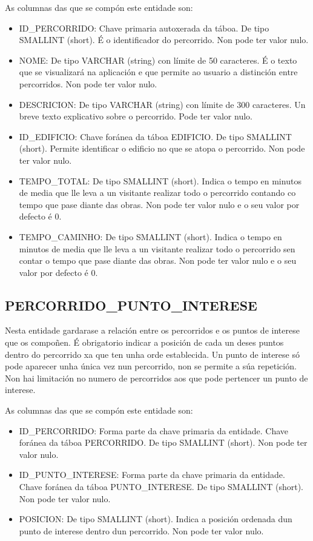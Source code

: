 As columnas das que se compón este entidade son:
\begin{itemize}
	\item ID\_PERCORRIDO: Chave primaria autoxerada da táboa. De tipo SMALLINT (short). É o identificador do percorrido. Non pode ter valor nulo.
	\item NOME: De tipo VARCHAR (string) con límite de 50 caracteres. É o texto que se visualizará na aplicación e que permite ao usuario a distinción entre percorridos. Non pode ter valor nulo.
	\item DESCRICION: De tipo VARCHAR (string) con límite de 300 caracteres. Un breve texto explicativo sobre o percorrido. Pode ter valor nulo.
	\item ID\_EDIFICIO: Chave foránea da táboa EDIFICIO. De tipo SMALLINT (short). Permite identificar o edificio no que se atopa o percorrido. Non pode ter valor nulo.
	\item TEMPO\_TOTAL: De tipo SMALLINT (short). Indica o tempo en minutos de media que lle leva a un visitante realizar todo o percorrido contando co tempo que pase diante das obras. Non pode ter valor nulo e o seu valor por defecto é 0.
	\item TEMPO\_CAMINHO: De tipo SMALLINT (short). Indica o tempo en minutos de media que lle leva a un visitante realizar todo o percorrido sen contar o tempo que pase diante das obras. Non pode ter valor nulo e o seu valor por defecto é 0.
\end{itemize}


\subsection{PERCORRIDO\_PUNTO\_INTERESE}
Nesta entidade gardarase a relación entre os percorridos e os puntos de interese que os compoñen. É obrigatorio indicar a posición de cada un deses puntos dentro do percorrido xa que ten unha orde establecida. Un punto de interese só pode aparecer unha única vez nun percorrido, non se permite a súa repetición. Non hai limitación no numero de percorridos aos que pode pertencer un punto de interese.

As columnas das que se compón este entidade son:
\begin{itemize}
	\item ID\_PERCORRIDO: Forma parte da chave primaria da entidade. Chave foránea da táboa PERCORRIDO. De tipo SMALLINT (short). Non pode ter valor nulo.
	\item ID\_PUNTO\_INTERESE: Forma parte da chave primaria da entidade. Chave foránea da táboa PUNTO\_INTERESE. De tipo SMALLINT (short). Non pode ter valor nulo.
	\item POSICION: De tipo SMALLINT (short). Indica a posición ordenada dun punto de interese dentro dun percorrido. Non pode ter valor nulo.
\end{itemize}


